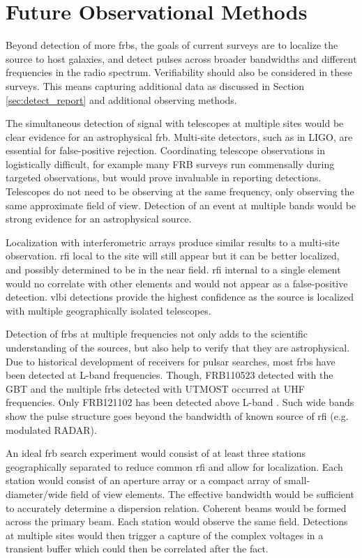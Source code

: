 \documentclass[a4paper,fleqn,usenatbib]{mnras}
\begin{document}
\section{Future Observational Methods}

Beyond detection of more \glspl{frb}, the goals of current surveys are to
localize the source to host galaxies, and detect pulses across broader
bandwidths and different frequencies in the radio spectrum. Verifiability should
also be considered in these surveys. This means capturing additional data as
discussed in Section \ref{sec:detect_report} and additional observing methods.

The simultaneous detection of signal with telescopes at multiple sites would be
clear evidence for an astrophysical \gls{frb}.  Multi-site detectors, such as in
LIGO, are essential for false-positive rejection. Coordinating telescope
observations in logistically difficult, for example many FRB surveys run
commensally during targeted observations, but would prove invaluable in
reporting detections. Telescopes do not need to be observing at the same
frequency, only observing the same approximate field of view. Detection of an
event at multiple bands would be strong evidence for an astrophysical source.

Localization with interferometric arrays produce similar results to a multi-site
observation. \gls{rfi} local to the site will still appear but it can be better
localized, and possibly determined to be in the near field. \gls{rfi} internal
to a single element would no correlate with other elements and would not appear
as a false-positive detection.  \gls{vlbi} detections provide the highest
confidence as the source is localized with multiple geographically isolated
telescopes.

Detection of \glspl{frb} at multiple frequencies not only adds to the scientific
understanding of the sources, but also help to verify that they are
astrophysical.  Due to historical development of receivers for pulsar searches,
most \glspl{frb} have been detected at L-band frequencies. Though, FRB110523
detected with the GBT and the multiple \glspl{frb} detected with UTMOST occurred
at UHF frequencies.  Only FRB121102 has been detected above L-band
\citep{atel10675}.  Such wide bands show the pulse structure goes beyond the
bandwidth of known source of \gls{rfi} (e.g. modulated RADAR).

An ideal \gls{frb} search experiment would consist of at least three stations
geographically separated to reduce common \gls{rfi} and allow for localization.
Each station would consist of an aperture array or a compact array of
small-diameter/wide field of view elements. The effective bandwidth would be
sufficient to accurately determine a dispersion relation.  Coherent beams would
be formed across the primary beam. Each station would observe the same field.
Detections at multiple sites would then trigger a capture of the complex
voltages in a transient buffer which could then be correlated after the fact. 
\end{document}
